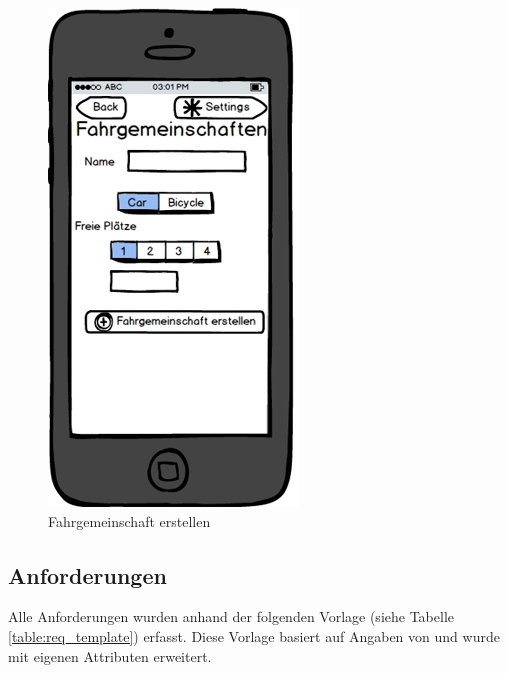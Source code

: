 \begin{figure}[h]
\centering
\includegraphics[scale=0.5]{images/mockups/carpool_add.png}
\caption{Fahrgemeinschaft erstellen}
\label{fig:mockup_add_carpool}
\end{figure}

\newpage
\subsection{Anforderungen}\label{anforderungen}
Alle Anforderungen wurden anhand der folgenden Vorlage (siehe Tabelle \ref{table:req_template}) erfasst. Diese Vorlage basiert auf Angaben von \cite{req_eng_book} und wurde mit eigenen Attributen erweitert.

